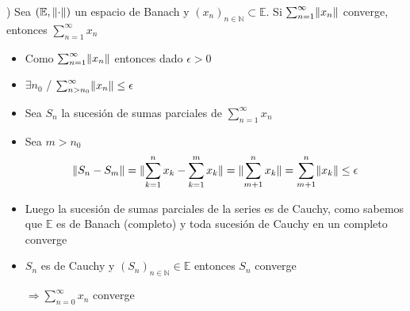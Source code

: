 \documentclass[12pt]{article}
\newcommand{\E}{\mathbb{E}}
\newcommand{\N}{\mathbb{N}}
\newcommand{\Ra}{\Rightarrow}
\DeclarePairedDelimiter{\norm}{\lVert}{\rVert}
\begin{document}
) Sea $(\E,\norm \cdot)$ un espacio de Banach y $(x_{n})_{n \in \N} \subset \E$. Si $ \sum_{n=1}^{\infty}\norm{x_{n}} $ converge, entonces $\sum_{n=1}^{\infty} x_{n}$
	\begin{itemize}
		\item Como $\sum_{n=1}^{\infty} \norm{x_{n}}$ entonces dado $\epsilon > 0$

		\item $\exists n_{0} $ / $\sum_{n > n_{0}}^{\infty} \norm{x_{n}} \leq \epsilon$

		\item Sea $S_{n} $ la sucesión de sumas parciales de $ \sum_{n=1}^{\infty} x_{n}$
			
		\item Sea $m > n_{0} $ $$\norm{S_{n} - S_{m}} = \norm{\sum_{k=1}^{n} x_{k} - \sum_{k=1}^{m} x_{k} } = \norm{\sum_{m+1}^{n} x_{k}}  = \sum_{m+1}^{n} \norm{x_{k}} \leq \epsilon$$

		\item Luego la sucesión de sumas parciales de la series es de Cauchy, como sabemos que $\E$ es de Banach (completo) y toda sucesión de Cauchy en un completo converge 

		\item $S_{n}$ es de Cauchy y $(S_{n})_{n \in \N} \in \E $ entonces $ S_{n}$ converge

		$\Ra \sum_{n=0}^{\infty} x_{n}$ converge
	\end{itemize}
\end{document}
